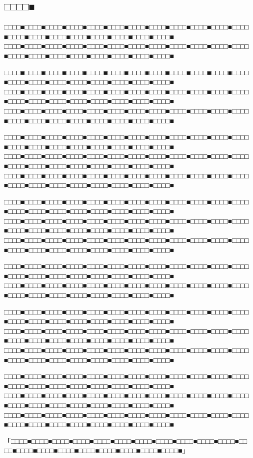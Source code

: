 \documentclass[
tate,
book,
openany,
paper={202mm,270mm},
oneside,
fontsize=9pt, %
jafontsize=9pt, %
head_space=11truemm, %
gutter=8truemm, %
line_length=78zw, %
number_of_lines=35, %
column_gap=5truemm,%
headfoot_verticalposition=4truemm,%
draft
]{jlreq}
\begin{document}
\begin{multicols*}{3}
\chapter*{□□□□■}
\thispagestyle{chapter}

□□□□■□□□□■□□□□■□□□□■□□□□■□□□□■□□□□■□□□□■□□□□■□□□□■□□□□■□□□□■□□□□■□□□□■□□□□■□□□□■□□□□■□□□□■□□□□■□□□□■
□□□□■□□□□■□□□□■□□□□■□□□□■□□□□■□□□□■□□□□■□□□□■□□□□■□□□□■□□□□■□□□□■□□□□■□□□□■□□□□■□□□□■□□□□■□□□□■□□□□■

□□□□■□□□□■□□□□■□□□□■□□□□■□□□□■□□□□■□□□□■□□□□■□□□□■□□□□■□□□□■□□□□■□□□□■□□□□■□□□□■□□□□■□□□□■□□□□■□□□□■
□□□□■□□□□■□□□□■□□□□■□□□□■□□□□■□□□□■□□□□■□□□□■□□□□■□□□□■□□□□■□□□□■□□□□■□□□□■□□□□■□□□□■□□□□■□□□□■□□□□■
□□□□■□□□□■□□□□■□□□□■□□□□■□□□□■□□□□■□□□□■□□□□■□□□□■□□□□■□□□□■□□□□■□□□□■□□□□■□□□□■□□□□■□□□□■□□□□■□□□□■

□□□□■□□□□■□□□□■□□□□■□□□□■□□□□■□□□□■□□□□■□□□□■□□□□■□□□□■□□□□■□□□□■□□□□■□□□□■□□□□■□□□□■□□□□■□□□□■□□□□■
□□□□■□□□□■□□□□■□□□□■□□□□■□□□□■□□□□■□□□□■□□□□■□□□□■□□□□■□□□□■□□□□■□□□□■□□□□■□□□□■□□□□■□□□□■□□□□■□□□□■
□□□□■□□□□■□□□□■□□□□■□□□□■□□□□■□□□□■□□□□■□□□□■□□□□■□□□□■□□□□■□□□□■□□□□■□□□□■□□□□■□□□□■□□□□■□□□□■□□□□■

□□□□■□□□□■□□□□■□□□□■□□□□■□□□□■□□□□■□□□□■□□□□■□□□□■□□□□■□□□□■□□□□■□□□□■□□□□■□□□□■□□□□■□□□□■□□□□■□□□□■
□□□□■□□□□■□□□□■□□□□■□□□□■□□□□■□□□□■□□□□■□□□□■□□□□■□□□□■□□□□■□□□□■□□□□■□□□□■□□□□■□□□□■□□□□■□□□□■□□□□■
□□□□■□□□□■□□□□■□□□□■□□□□■□□□□■□□□□■□□□□■□□□□■□□□□■□□□□■□□□□■□□□□■□□□□■□□□□■□□□□■□□□□■□□□□■□□□□■□□□□■

□□□□■□□□□■□□□□■□□□□■□□□□■□□□□■□□□□■□□□□■□□□□■□□□□■□□□□■□□□□■□□□□■□□□□■□□□□■□□□□■□□□□■□□□□■□□□□■□□□□■
□□□□■□□□□■□□□□■□□□□■□□□□■□□□□■□□□□■□□□□■□□□□■□□□□■□□□□■□□□□■□□□□■□□□□■□□□□■□□□□■□□□□■□□□□■□□□□■□□□□■

□□□□■□□□□■□□□□■□□□□■□□□□■□□□□■□□□□■□□□□■□□□□■□□□□■□□□□■□□□□■□□□□■□□□□■□□□□■□□□□■□□□□■□□□□■□□□□■□□□□■
□□□□■□□□□■□□□□■□□□□■□□□□■□□□□■□□□□■□□□□■□□□□■□□□□■□□□□■□□□□■□□□□■□□□□■□□□□■□□□□■□□□□■□□□□■□□□□■□□□□■
□□□□■□□□□■□□□□■□□□□■□□□□■□□□□■□□□□■□□□□■□□□□■□□□□■□□□□■□□□□■□□□□■□□□□■□□□□■□□□□■□□□□■□□□□■□□□□■□□□□■

□□□□■□□□□■□□□□■□□□□■□□□□■□□□□■□□□□■□□□□■□□□□■□□□□■□□□□■□□□□■□□□□■□□□□■□□□□■□□□□■□□□□■□□□□■□□□□■□□□□■
□□□□■□□□□■□□□□■□□□□■□□□□■□□□□■□□□□■□□□□■□□□□■□□□□■□□□□■□□□□■□□□□■□□□□■□□□□■□□□□■□□□□■□□□□■□□□□■□□□□■
□□□□■□□□□■□□□□■□□□□■□□□□■□□□□■□□□□■□□□□■□□□□■□□□□■□□□□■□□□□■□□□□■□□□□■□□□□■□□□□■□□□□■□□□□■□□□□■□□□□■

「□□□□■□□□□■□□□□■□□□□■□□□□■□□□□■□□□□■□□□□■□□□□■□□□□■□□□□■□□□□■□□□□■□□□□■□□□□■□□□□■□□□□■□□□□■□□□□■□□□□■」


\end{multicols*}
\end{document}
